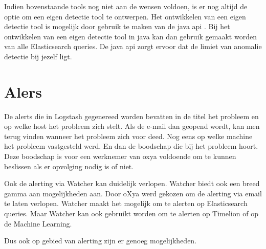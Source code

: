 Indien bovenstaande tools nog niet aan de wensen voldoen, is er nog altijd de optie om een eigen detectie tool te ontwerpen. Het ontwikkelen van een eigen detectie tool is mogelijk door gebruik te maken van de java api \autocite{javaapi}. 
Bij het ontwikkelen van een eigen detectie tool in java kan dan gebruik gemaakt worden van alle Elasticsearch queries. 
De java api zorgt ervoor dat de limiet van anomalie detectie bij jezelf ligt.

\section{Alers}
\label{sec:alerts}

De alerts die in Logstash gegenereed worden bevatten in de titel het probleem en op welke host het probleem zich stelt.
Als de e-mail dan geopend wordt, kan men terug vinden wanneer het probleem zich voor deed. Nog eens op welke machine het probleem vastgesteld werd. En dan de boodschap die bij het probleem hoort. 
Deze boodschap is voor een werknemer van oxya voldoende om te kunnen beslissen als er opvolging nodig is of niet.

Ook de alerting via Watcher kan duidelijk verlopen. Watcher biedt ook een breed gamma aan mogelijkheden aan. Door oXya werd gekozen om de alerting via email te laten verlopen.
Watcher maakt het mogelijk om te alerten op Elasticsearch queries. Maar Watcher kan ook gebruikt worden om te alerten op Timelion of op de Machine Learning.

Dus ook op gebied van alerting zijn er genoeg mogelijkheden.
